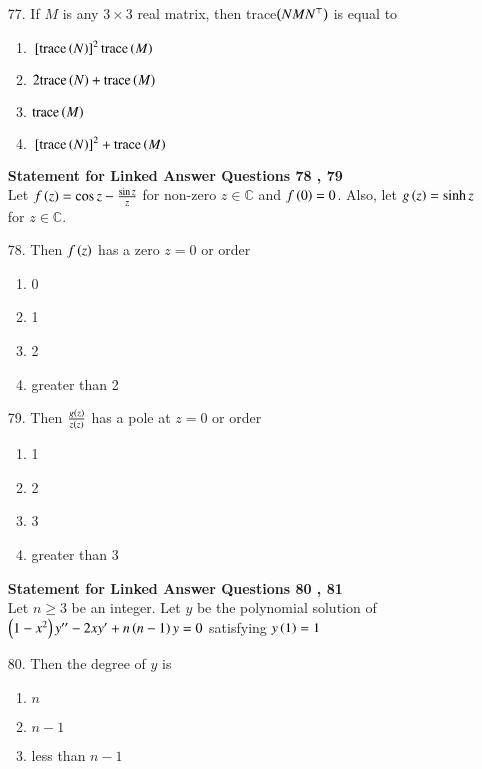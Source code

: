 \documentclass[journal,12pt,onecolumn]{IEEEtran}
\theoremstyle{remark}
\begin{document}
\begin{enumerate}
    \item[77.] If $M$ is any $3 \times 3$ real matrix, then trace$\left(NMN^{\top}\right)$ is equal to
		\hfill{}
\begin{enumerate}
    \item ${}\left[\textnormal{trace}\left(N\right)\right]^2 \textnormal{trace}\left(M\right)$ 
    \item $2\textnormal{trace}\left(N\right) + \textnormal{trace}\left(M\right)$
    \item $\textnormal{trace}\left(M\right)$
    \item ${}\left[\textnormal{trace}\left(N\right)\right]^2 + \textnormal{trace}\left(M\right)$ 
		\end{enumerate}
\textbf{Statement for Linked Answer Questions 78 , 79}\\
Let $f\left(z\right) = \cos z - \frac{\sin z}{z}$ for non-zero $z \in \mathbb{C}$ and $f\left(0\right) = 0$.
Also, let $g\left(z\right) = \sinh z$ for $z \in \mathbb{C}$.
    \item[78.] Then $f\left(z\right)$ has a zero $z = 0$ or order 
		\hfill{}
        \begin{enumerate}
    \item 0 
    \item 1
    \item 2
    \item greater than 2
        \end{enumerate}
\item[79.] Then $\frac{g\left(z\right)}{z\left(z\right)}$ has a pole at $z = 0$ or order 
		\hfill{}
        \begin{enumerate}
    \item 1
    \item 2
    \item 3 
    \item greater than 3
        \end{enumerate}
\textbf{Statement for Linked Answer Questions 80 , 81}\\
Let $n \ge 3$ be an integer. Let $y$ be the polynomial solution of $\left(1-x^2\right)y^{\prime \prime}
-2xy^{\prime} + n\left(n-1\right)y = 0$ satisfying $y\left(1\right) = 1$
	\item[80.] Then the degree of $y$ is
		\hfill{}
        \begin{multicols}{4}
		\begin{enumerate}
			\item $n$ 
			\columnbreak
			\item $n -1$
			\columnbreak
			\item less than $n-1$

\end{enumerate}
\end{multicols}
\end{enumerate}
\end{document}
